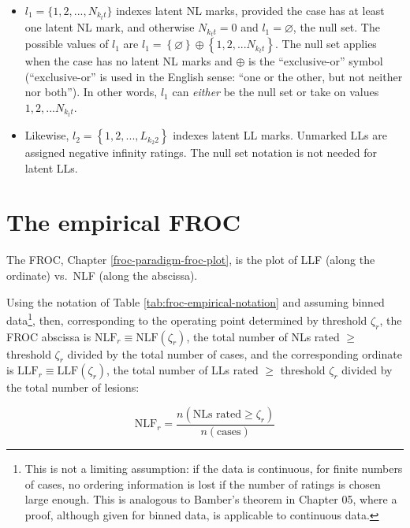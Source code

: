 \documentclass[
]{book}
\begin{document}
\begin{itemize}
\item
  \(l_1 = \{1, 2, ..., N_{k_t t}\}\) indexes latent NL marks, provided the case has at least one latent NL mark, and otherwise \(N_{k_t t} = 0\) and \(l_1 = \varnothing\), the null set. The possible values of \(l_1\) are \(l_1 = \left \{ \varnothing \right \}\oplus \left \{ 1,2,...N_{k_t t} \right \}\). The null set applies when the case has no latent NL marks and \(\oplus\) is the ``exclusive-or'' symbol (``exclusive-or'' is used in the English sense: ``one or the other, but not neither nor both''). In other words, \(l_1\) can \emph{either} be the null set or take on values \(1,2,...N_{k_t t}\).
\item
  Likewise, \(l_2 = \left \{ 1,2,...,L_{k_2 2} \right \}\) indexes latent LL marks. Unmarked LLs are assigned negative infinity ratings. The null set notation is not needed for latent LLs.
\end{itemize}

\hypertarget{froc-empirical-froc-plot}{%
\section{The empirical FROC}\label{froc-empirical-froc-plot}}

The FROC, Chapter \ref{froc-paradigm-froc-plot}, is the plot of LLF (along the ordinate) vs.~NLF (along the abscissa).

Using the notation of Table \ref{tab:froc-empirical-notation} and assuming binned data\footnote{This is not a limiting assumption: if the data is continuous, for finite numbers of cases, no ordering information is lost if the number of ratings is chosen large enough. This is analogous to Bamber's theorem in Chapter 05, where a proof, although given for binned data, is applicable to continuous data.}, then, corresponding to the operating point determined by threshold \(\zeta_r\), the FROC abscissa is \(\text{NLF}_r \equiv \text{NLF}\left ( \zeta_r \right )\), the total number of NLs rated \(\geq\) threshold \(\zeta_r\) divided by the total number of cases, and the corresponding ordinate is \(\text{LLF}_r \equiv \text{LLF}\left ( \zeta_r \right )\), the total number of LLs rated \(\geq\) threshold \(\zeta_r\) divided by the total number of lesions:

\begin{equation}
\text{NLF}_r  = \frac{n\left ( \text{NLs rated} \geq \zeta_r\right )}{n\left ( \text{cases} \right )}
\label{eq:froc-empirical-NLF1}
\end{equation}
\end{document}
